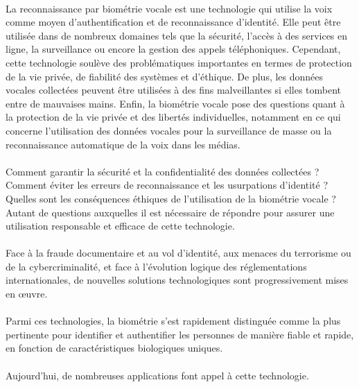 \paragraph{}La reconnaissance par biométrie vocale est une technologie qui utilise la voix comme moyen d'authentification et de reconnaissance d'identité. Elle peut être utilisée dans de nombreux domaines tels que la sécurité, l'accès à des services en ligne, la surveillance ou encore la gestion des appels téléphoniques. Cependant, cette technologie soulève des problématiques importantes en termes de protection de la vie privée, de fiabilité des systèmes et d'éthique. De plus, les données vocales collectées peuvent être utilisées à des fins malveillantes si elles tombent entre de mauvaises mains. Enfin, la biométrie vocale pose des questions quant à la protection de la vie privée et des libertés individuelles, notamment en ce qui concerne l'utilisation des données vocales pour la surveillance de masse ou la reconnaissance automatique de la voix dans les médias.
\paragraph{}Comment garantir la sécurité et la confidentialité des données collectées ? Comment éviter les erreurs de reconnaissance et les usurpations d'identité ? Quelles sont les conséquences éthiques de l'utilisation de la biométrie vocale ? Autant de questions auxquelles il est nécessaire de répondre pour assurer une utilisation responsable et efficace de cette technologie. 


\paragraph{}Face à la fraude documentaire et au vol d'identité, aux menaces du terrorisme ou de la cybercriminalité, et face à l'évolution logique des réglementations internationales, de nouvelles solutions technologiques sont progressivement mises en œuvre.
\paragraph{}Parmi ces technologies, la biométrie s'est rapidement distinguée comme la plus pertinente pour identifier et authentifier les personnes de manière fiable et rapide, en fonction de caractéristiques biologiques uniques.
\paragraph{}Aujourd'hui, de nombreuses applications font appel à cette technologie.
